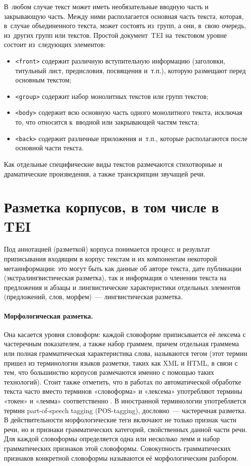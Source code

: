 \documentclass[12pt]{article}
\theoremstyle{definition}
\theoremstyle{remark}
\numberwithin{equation}{section}
\begin{document}
В~любом случае текст может иметь необязательные вводную часть
и закрывающую часть. Между ними располагается основная часть
текста, которая, в~случае объединенного текста, может состоять
из~групп, а они, в~свою очередь, из~других групп или текстов.
Простой документ~TEI на~текстовом уровне состоит из~следующих
элементов:
\begin{itemize}
    \item \texttt{<front>} содержит различную вступительную
    информацию (заголовки, титульный лист, предисловия, посвящения
    и~т.п.), которую размещают перед основным текстом;
    \item \texttt{<group>} содержит набор монолитных текстов
    или групп текстов;
    \item \texttt{<body>} содержит всю основную часть одного
    монолитного текста, исключая то, что относится к~вводной
    или закрывающей частям текста;
    \item \texttt{<back>} содержит различные приложения и~т.п.,
    которые располагаются после основной части текста.
\end{itemize}
Как отдельные специфические виды текстов размечаются стихотворные
и драматические произведения, а также транскрипции звучащей речи.

\section{Разметка корпусов, в том числе в TEI}

Под аннотацией (разметкой) корпуса понимается процесс и результат приписывания входящим в корпус текстам и их компонентам некоторой метаинформации: это могут быть как данные об авторе текста, дате публикации (экстралингвистическая разметка), так и информация о членении текста на предложения и абзацы и лингвистические характеристики отдельных элементов (предложений, слов, морфем)~--- лингвистическая разметка.

\paragraph{Морфологическая разметка.} Она касается уровня словоформ: каждой словоформе приписывается её лексема с частеречным показателем, а также набор граммем, причем отдельная граммема или полная грамматическая характеристика слова, называются тегом (этот термин пришел из терминологии языков разметки, таких как XML и HTML, в связи с тем, что большинство корпусов размечаются именно с помощью таких технологий). Стоит также отметить, что в работах по автоматической обработке текста часто вместо терминов «словоформа» и «лексема» употребляют термины «токен» и «лемма» соответственно . В иностранной терминологии употребляется термин part-of-speech tagging (POS-tagging), дословно~--- частеречная разметка. В действительности морфологические теги включают не только признак части речи, но и признаки грамматических категорий, свойственных данной части речи. Для каждой словоформы определяется одна или несколько лемм и набор грамматических признаков этой словоформы. Совокупность грамматических признаков конкретной словоформы называются её морфологическим разбором.
\end{document}
